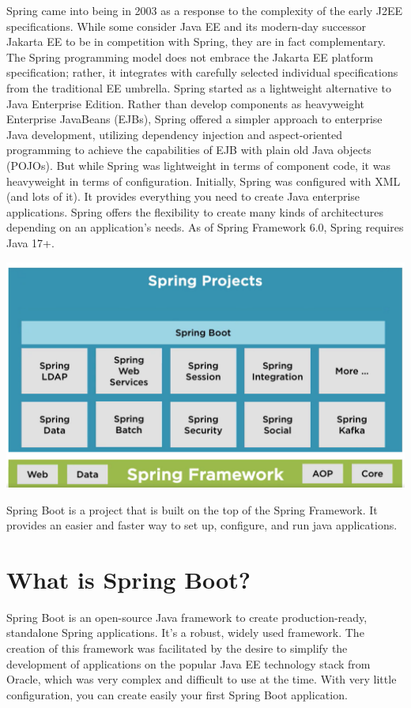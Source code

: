 \documentclass[a4paper, 12pt]{report}
\begin{document}
Spring came into being in 2003 as a response to the complexity of the early J2EE specifications. While some consider Java EE and its modern-day successor Jakarta EE to be in competition with Spring, they are in fact complementary. The Spring programming model does not embrace the Jakarta EE platform specification; rather, it integrates with carefully selected individual specifications from the traditional EE umbrella. Spring started as a lightweight alternative to Java Enterprise Edition. Rather than develop components as heavyweight Enterprise
JavaBeans (EJBs), Spring offered a simpler approach to enterprise Java development, utilizing dependency injection and aspect-oriented programming to achieve the capabilities of EJB with plain old Java objects (POJOs).
But while Spring was lightweight in terms of component code, it was heavyweight in terms of configuration. Initially, Spring was configured with XML (and lots of it).
It provides everything you need to create Java enterprise applications. Spring offers the flexibility to create many kinds of architectures depending on an application’s needs. As of Spring Framework 6.0, Spring requires Java 17+.

\includegraphics[width=\textwidth]{./images/chapter1/spring_framework.png} 

Spring Boot is a project that is built on the top of the Spring Framework. It provides an easier and faster way to set up, configure, and run java applications.

    
\section{What is Spring Boot?}
 
Spring Boot is an open-source Java framework to create production-ready,  standalone Spring applications. It's a robust, widely used framework. The creation of this framework was facilitated by the desire to simplify the development of applications on the popular Java EE technology stack from Oracle, which was very complex and difficult to use at the time. With very little configuration, you can create easily your first Spring Boot application.
\end{document}
